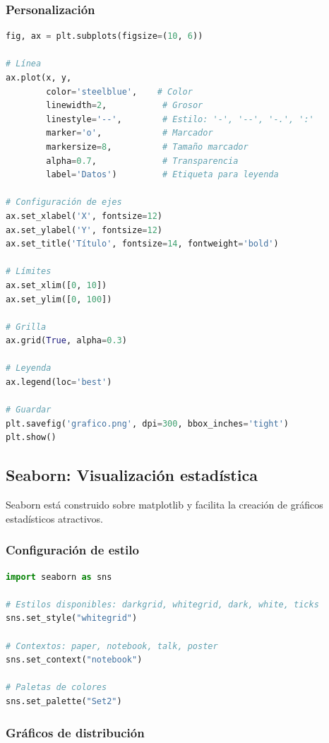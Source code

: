 \documentclass[a4paper,11pt]{article}
\begin{document}
\subsubsection{Personalización}

\begin{lstlisting}[language=Python]
fig, ax = plt.subplots(figsize=(10, 6))

# Línea
ax.plot(x, y, 
        color='steelblue',    # Color
        linewidth=2,           # Grosor
        linestyle='--',        # Estilo: '-', '--', '-.', ':'
        marker='o',            # Marcador
        markersize=8,          # Tamaño marcador
        alpha=0.7,             # Transparencia
        label='Datos')         # Etiqueta para leyenda

# Configuración de ejes
ax.set_xlabel('X', fontsize=12)
ax.set_ylabel('Y', fontsize=12)
ax.set_title('Título', fontsize=14, fontweight='bold')

# Límites
ax.set_xlim([0, 10])
ax.set_ylim([0, 100])

# Grilla
ax.grid(True, alpha=0.3)

# Leyenda
ax.legend(loc='best')

# Guardar
plt.savefig('grafico.png', dpi=300, bbox_inches='tight')
plt.show()
\end{lstlisting}

\subsection{Seaborn: Visualización estadística}

Seaborn está construido sobre matplotlib y facilita la creación de gráficos estadísticos atractivos.

\subsubsection{Configuración de estilo}

\begin{lstlisting}[language=Python]
import seaborn as sns

# Estilos disponibles: darkgrid, whitegrid, dark, white, ticks
sns.set_style("whitegrid")

# Contextos: paper, notebook, talk, poster
sns.set_context("notebook")

# Paletas de colores
sns.set_palette("Set2")
\end{lstlisting}

\subsubsection{Gráficos de distribución}
\end{document}
